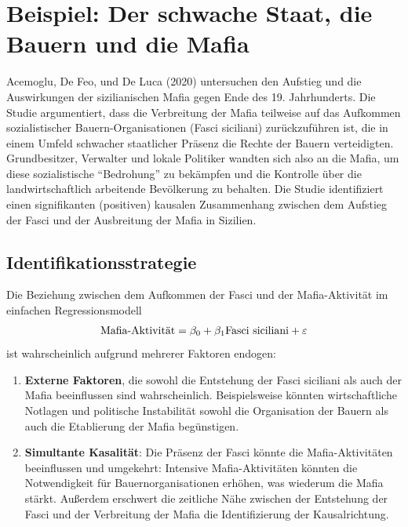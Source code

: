 \documentclass[
  a4paper,
  DIV=11,
  oneside]{scrreprt}
\begin{document}
\section{Beispiel: Der schwache Staat, die Bauern und die
Mafia}\label{beispiel-der-schwache-staat-die-bauern-und-die-mafia}

Acemoglu, De Feo, und De Luca (2020) untersuchen den Aufstieg und die
Auswirkungen der sizilianischen Mafia gegen Ende des 19. Jahrhunderts.
Die Studie argumentiert, dass die Verbreitung der Mafia teilweise auf
das Aufkommen sozialistischer Bauern-Organisationen (Fasci siciliani)
zurückzuführen ist, die in einem Umfeld schwacher staatlicher Präsenz
die Rechte der Bauern verteidigten. Grundbesitzer, Verwalter und lokale
Politiker wandten sich also an die Mafia, um diese sozialistische
``Bedrohung'' zu bekämpfen und die Kontrolle über die landwirtschaftlich
arbeitende Bevölkerung zu behalten. Die Studie identifiziert einen
signifikanten (positiven) kausalen Zusammenhang zwischen dem Aufstieg
der Fasci und der Ausbreitung der Mafia in Sizilien.

\subsection{Identifikationsstrategie}\label{identifikationsstrategie}

Die Beziehung zwischen dem Aufkommen der Fasci und der Mafia-Aktivität
im einfachen Regressionsmodell \begin{align}
  \textup{Mafia-Aktivität} = \beta_0 + \beta_1 \textup{Fasci siciliani} + \varepsilon \label{eq:fascimafiamod1}
\end{align} ist wahrscheinlich aufgrund mehrerer Faktoren endogen:

\begin{enumerate}
\def\labelenumi{\arabic{enumi}.}
\item
  \textbf{Externe Faktoren}, die sowohl die Entstehung der Fasci
  siciliani als auch der Mafia beeinflussen sind wahrscheinlich.
  Beispielsweise könnten wirtschaftliche Notlagen und politische
  Instabilität sowohl die Organisation der Bauern als auch die
  Etablierung der Mafia begünstigen.
\item
  \textbf{Simultante Kasalität}: Die Präsenz der Fasci könnte die
  Mafia-Aktivitäten beeinflussen und umgekehrt: Intensive
  Mafia-Aktivitäten könnten die Notwendigkeit für Bauernorganisationen
  erhöhen, was wiederum die Mafia stärkt. Außerdem erschwert die
  zeitliche Nähe zwischen der Entstehung der Fasci und der Verbreitung
  der Mafia die Identifizierung der Kausalrichtung.
\end{enumerate}
\end{document}
